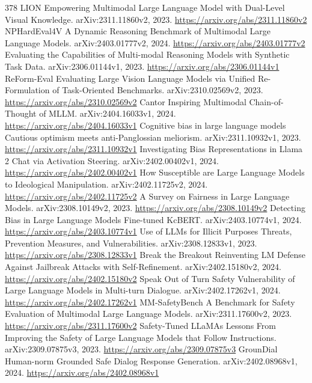 \documentclass[11pt]{article}
\begin{document}
\begin{thebibliography}{378}
 LION Empowering Multimodal Large Language Model with Dual-Level Visual Knowledge. arXiv:2311.11860v2, 2023. \url{https://arxiv.org/abs/2311.11860v2}
 NPHardEval4V A Dynamic Reasoning Benchmark of Multimodal Large Language Models. arXiv:2403.01777v2, 2024. \url{https://arxiv.org/abs/2403.01777v2}
 Evaluating the Capabilities of Multi-modal Reasoning Models with Synthetic Task Data. arXiv:2306.01144v1, 2023. \url{https://arxiv.org/abs/2306.01144v1}
 ReForm-Eval Evaluating Large Vision Language Models via Unified Re-Formulation of Task-Oriented Benchmarks. arXiv:2310.02569v2, 2023. \url{https://arxiv.org/abs/2310.02569v2}
 Cantor Inspiring Multimodal Chain-of-Thought of MLLM. arXiv:2404.16033v1, 2024. \url{https://arxiv.org/abs/2404.16033v1}
 Cognitive bias in large language models Cautious optimism meets anti-Panglossian meliorism. arXiv:2311.10932v1, 2023. \url{https://arxiv.org/abs/2311.10932v1}
 Investigating Bias Representations in Llama 2 Chat via Activation Steering. arXiv:2402.00402v1, 2024. \url{https://arxiv.org/abs/2402.00402v1}
 How Susceptible are Large Language Models to Ideological Manipulation. arXiv:2402.11725v2, 2024. \url{https://arxiv.org/abs/2402.11725v2}
 A Survey on Fairness in Large Language Models. arXiv:2308.10149v2, 2023. \url{https://arxiv.org/abs/2308.10149v2}
 Detecting Bias in Large Language Models Fine-tuned KcBERT. arXiv:2403.10774v1, 2024. \url{https://arxiv.org/abs/2403.10774v1}
 Use of LLMs for Illicit Purposes Threats, Prevention Measures, and Vulnerabilities. arXiv:2308.12833v1, 2023. \url{https://arxiv.org/abs/2308.12833v1}
 Break the Breakout Reinventing LM Defense Against Jailbreak Attacks with Self-Refinement. arXiv:2402.15180v2, 2024. \url{https://arxiv.org/abs/2402.15180v2}
 Speak Out of Turn Safety Vulnerability of Large Language Models in Multi-turn Dialogue. arXiv:2402.17262v1, 2024. \url{https://arxiv.org/abs/2402.17262v1}
 MM-SafetyBench A Benchmark for Safety Evaluation of Multimodal Large Language Models. arXiv:2311.17600v2, 2023. \url{https://arxiv.org/abs/2311.17600v2}
 Safety-Tuned LLaMAs Lessons From Improving the Safety of Large Language Models that Follow Instructions. arXiv:2309.07875v3, 2023. \url{https://arxiv.org/abs/2309.07875v3}
 GrounDial Human-norm Grounded Safe Dialog Response Generation. arXiv:2402.08968v1, 2024. \url{https://arxiv.org/abs/2402.08968v1}

\end{thebibliography}
\end{document}
